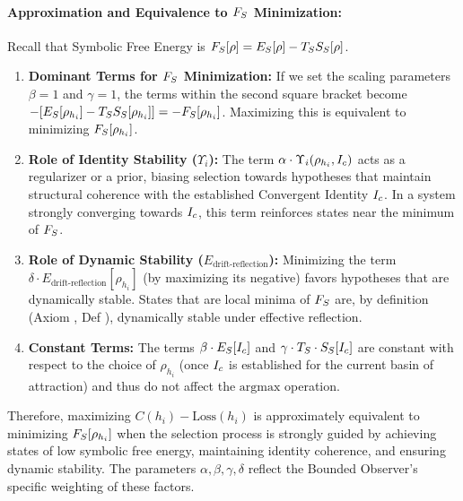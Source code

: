 \paragraph{Approximation and Equivalence to \(F_S\) Minimization:}
Recall that Symbolic Free Energy is \(F_S[\rho] = E_S[\rho] - T_S S_S[\rho]\).
\begin{enumerate}
    \item \textbf{Dominant Terms for \(F_S\) Minimization:} If we set the scaling parameters \(\beta = 1\) and \(\gamma = 1\), the terms within the second square bracket become \(-[E_S[\rho_{h_i}] - T_S S_S[\rho_{h_i}]] = -F_S[\rho_{h_i}]\). Maximizing this is equivalent to minimizing \(F_S[\rho_{h_i}]\).
    \item \textbf{Role of Identity Stability (\(\Upsilon_i\)):} The term \(\alpha \cdot \Upsilon_i(\rho_{h_i}, I_c)\) acts as a regularizer or a prior, biasing selection towards hypotheses that maintain structural coherence with the established Convergent Identity \(I_c\). In a system strongly converging towards \(I_c\), this term reinforces states near the minimum of \(F_S\).
    \item \textbf{Role of Dynamic Stability (\(E_{\text{drift-reflection}}\)):} Minimizing the term \(\delta \cdot E_{\text{drift-reflection}}[\rho_{h_i}]\) (by maximizing its negative) favors hypotheses that are dynamically stable. States that are local minima of \(F_S\) are, by definition (Axiom , Def ), dynamically stable under effective reflection.
    \item \textbf{Constant Terms:} The terms \(\beta \cdot E_S[I_c]\) and \(\gamma \cdot T_S \cdot S_S[I_c]\) are constant with respect to the choice of \(\rho_{h_i}\) (once \(I_c\) is established for the current basin of attraction) and thus do not affect the \(\text{argmax}\) operation.
\end{enumerate}
Therefore, maximizing \(C(h_i) - \text{Loss}(h_i)\) is approximately equivalent to minimizing \(F_S[\rho_{h_i}]\) when the selection process is strongly guided by achieving states of low symbolic free energy, maintaining identity coherence, and ensuring dynamic stability. The parameters \(\alpha, \beta, \gamma, \delta\) reflect the Bounded Observer's specific weighting of these factors.
